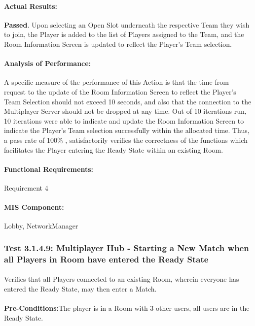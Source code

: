 \documentclass{article}
\begin{document}
    \paragraph{Actual Results:} \textbf{Passed}. Upon selecting an Open Slot underneath the respective Team they wish to join, the Player is added to the list of Players assigned to the Team, and the Room Information Screen is updated to reflect the Player's Team selection.
    \paragraph{Analysis of Performance:} A specific measure of the performance of this Action is that the time from request to the update of the Room Information Screen to reflect the Player's Team Selection should not exceed 10 seconds, and also that the connection to the Multiplayer Server should not be dropped at any time. Out of 10 iterations run, 10 iterations were able to indicate and update the Room Information Screen to indicate the Player's Team selection successfully within the allocated time.  Thus, a pass rate of 100\% , satisfactorily verifies the correctness of the functions which facilitates the Player entering the Ready State within an existing Room.
     \paragraph{Functional Requirements:} Requirement 4
    \paragraph{MIS Component:}  Lobby, NetworkManager
    
    \subsubsection{Test 3.1.4.9: Multiplayer Hub - Starting a New Match when all Players in Room have entered the Ready State}
    \paragraph{} Verifies that all Players connected to an existing Room, wherein everyone has entered the Ready State, may then enter a Match.
    \paragraph{}\textbf{Pre-Conditions:}The player is in a Room with 3 other users, all users are in the Ready State.
\end{document}
